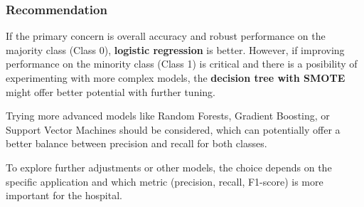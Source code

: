 \documentclass[11pt]{article}
\begin{document}
\subsubsection{Recommendation}\label{recommendation}

If the primary concern is overall accuracy and robust performance on the
majority class (Class 0), \textbf{logistic regression} is better.
However, if improving performance on the minority class (Class 1) is
critical and there is a posibility of experimenting with more complex
models, the \textbf{decision tree with SMOTE} might offer better
potential with further tuning.

Trying more advanced models like Random Forests, Gradient Boosting, or
Support Vector Machines should be considered, which can potentially
offer a better balance between precision and recall for both classes.

To explore further adjustments or other models, the choice depends on
the specific application and which metric (precision, recall, F1-score)
is more important for the hospital.


    
    
    
\end{document}
